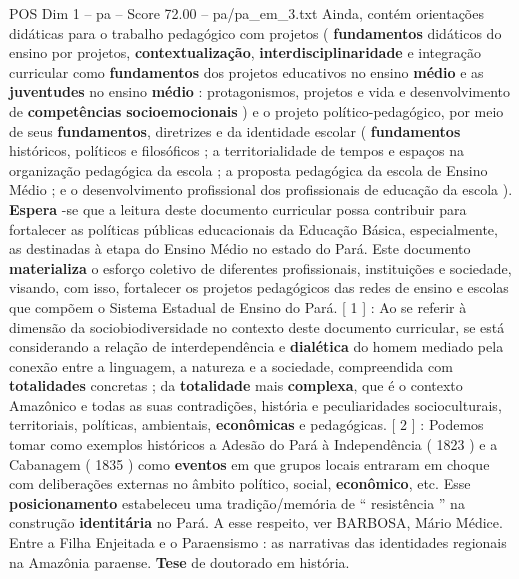 \begin{textsample}{POS Dim 1 – pa – Score 72.00 – pa/pa\_em\_3.txt}
Ainda, contém orientações didáticas para o trabalho pedagógico com projetos ( \textbf{fundamentos} didáticos do ensino por projetos, \textbf{contextualização}, \textbf{interdisciplinaridade} e integração curricular como \textbf{fundamentos} dos projetos educativos no ensino \textbf{médio} e as \textbf{juventudes} no ensino \textbf{médio} : protagonismos, projetos e vida e desenvolvimento de \textbf{competências} \textbf{socioemocionais} ) e o projeto político-pedagógico, por meio de seus \textbf{fundamentos}, diretrizes e da identidade escolar ( \textbf{fundamentos} históricos, políticos e filosóficos ; a territorialidade de tempos e espaços na organização pedagógica da escola ; a proposta pedagógica da escola de Ensino Médio ; e o desenvolvimento profissional dos profissionais de educação da escola ). \textbf{Espera} -se que a leitura deste documento curricular possa contribuir para fortalecer as políticas públicas educacionais da Educação Básica, especialmente, as destinadas à etapa do Ensino Médio no estado do Pará.
Este documento \textbf{materializa} o esforço coletivo de diferentes profissionais, instituições e sociedade, visando, com isso, fortalecer os projetos pedagógicos das redes de ensino e escolas que compõem o Sistema Estadual de Ensino do Pará. [ 1 ] : Ao se referir à dimensão da sociobiodiversidade no contexto deste documento curricular, se está considerando a relação de interdependência e \textbf{dialética} do homem mediado pela conexão entre a linguagem, a natureza e a sociedade, compreendida com \textbf{totalidades} concretas ; da \textbf{totalidade} mais \textbf{complexa}, que é o contexto Amazônico e todas as suas contradições, história e peculiaridades socioculturais, territoriais, políticas, ambientais, \textbf{econômicas} e pedagógicas. [ 2 ] : Podemos tomar como exemplos históricos a Adesão do Pará à Independência ( 1823 ) e a Cabanagem ( 1835 ) como \textbf{eventos} em que grupos locais entraram em choque com deliberações externas no âmbito político, social, \textbf{econômico}, etc.
Esse \textbf{posicionamento} estabeleceu uma tradição/memória de “ resistência ” na construção \textbf{identitária} no Pará.
A esse respeito, ver BARBOSA, Mário Médice.
Entre a Filha Enjeitada e o Paraensismo : as narrativas das identidades regionais na Amazônia paraense. \textbf{Tese} de doutorado em história.

\end{textsample}
